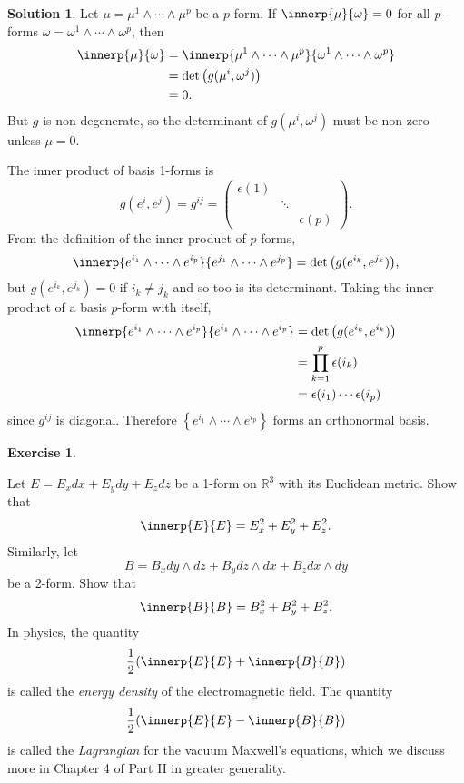 \documentclass[11pt, a4paper]{article}
\theoremstyle{definition}
\newtheorem{ex}{Exercise}[part]
\newtheorem{sol}{Solution}[part]
\begin{document}
\begin{sol}

Let $\mu = \mu^1 \wedge \cdots \wedge \mu^p$ be a $p$-form. If $\innerp{\mu}{ \omega} = 0$ for all $p$-forms $\omega = \omega^1 \wedge \cdots \wedge \omega^p$, then
\begin{align*}
    \innerp{\mu}{\omega} &= \innerp{\mu^1 \wedge \cdots \wedge \mu^p}
                                   {\omega^1 \wedge \cdots \wedge \omega^p} \\
        &= \det\big(g(\mu^i, \omega^j)\big) \\
        &= 0.
\end{align*}
But $g$ is non-degenerate, so the determinant of $g(\mu^i, \omega^j)$ must be non-zero unless $\mu = 0$.

The inner product of basis 1-forms is
\[
    g(e^i, e^j) = g^{ij} = \begin{pmatrix}
            \epsilon(1) & & \\
            & \ddots & \\
            & & \epsilon(p)
        \end{pmatrix}.
\]
From the definition of the inner product of $p$-forms,
\[
    \innerp{e^{i_1} \wedge \cdots \wedge e^{i_p}}
           {e^{j_1} \wedge \cdots \wedge e^{j_p}}
        = \det\big(g(e^{i_k}, e^{j_k})\big),
\]
but $g(e^{i_k}, e^{j_k}) = 0$ if $i_k \neq j_k$ and so too is its determinant.
Taking the inner product of a basis $p$-form with itself,
\begin{align*}
    \innerp{e^{i_1} \wedge \cdots \wedge e^{i_p}}
           {e^{i_1} \wedge \cdots \wedge e^{i_p}}
        &= \det\big(g(e^{i_k}, e^{i_k})\big) \\
        &= \prod_{k = 1}^p \epsilon(i_k) \\
        &= \epsilon(i_1) \cdots \epsilon(i_p)
\end{align*}
since $g^{ij}$ is diagonal. Therefore $\left\{e^{i_1} \wedge \cdots \wedge e^{i_p}\right\}$ forms an orthonormal basis.

\end{sol}

\begin{ex}\label{ex:esquaredbsquared}

Let $E = E_x dx + E_y dy + E_z dz$ be a 1-form on $\mathbb{R}^3$ with its Euclidean metric. Show that
\[
    \innerp{E}{E} = E_x^2 + E_y^2 + E_z^2.
\]
Similarly, let
\[
    B = B_x dy \wedge dz + B_y dz \wedge dx + B_z dx \wedge dy
\]
be a 2-form. Show that
\[
    \innerp{B}{B} = B_x^2 + B_y^2 + B_z^2.
\]
In physics, the quantity
\[
    \frac{1}{2}(\innerp{E}{E} + \innerp{B}{B})
\]
is called the \emph{energy density} of the electromagnetic field. The quantity
\[
    \frac{1}{2}(\innerp{E}{E} - \innerp{B}{B}) \label{eq:lagrangianvacuumem}
\]
is called the \emph{Lagrangian} for the vacuum Maxwell's equations, which we discuss more in Chapter 4 of Part II in greater generality.

\end{ex}
\end{document}
